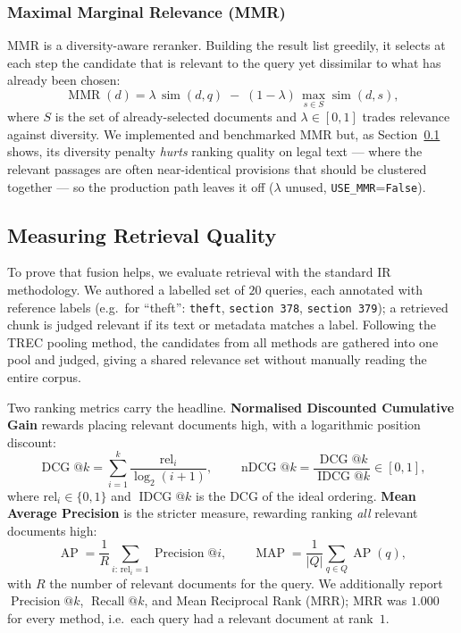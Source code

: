 \subsubsection{Maximal Marginal Relevance (MMR)}
MMR is a diversity-aware reranker. Building the result list greedily, it selects at each step
the candidate that is relevant to the query yet dissimilar to what has already been chosen:
\begin{equation}
\operatorname{MMR}(d) = \lambda\,\operatorname{sim}(d, q)
\;-\; (1-\lambda)\,\max_{s \in S}\operatorname{sim}(d, s),
\end{equation}
where $S$ is the set of already-selected documents and $\lambda \in [0,1]$ trades relevance
against diversity. We implemented and benchmarked MMR but, as Section~\ref{sec:ir-metrics}
shows, its diversity penalty \emph{hurts} ranking quality on legal text --- where the relevant
passages are often near-identical provisions that should be clustered together --- so the
production path leaves it off ($\lambda$ unused, \texttt{USE\_MMR}=\texttt{False}).

\subsection{Measuring Retrieval Quality}
\label{sec:ir-metrics}

To prove that fusion helps, we evaluate retrieval with the standard IR methodology. We
authored a labelled set of $20$ queries, each annotated with reference labels (e.g.\ for
``theft'': \texttt{theft}, \texttt{section~378}, \texttt{section~379}); a retrieved chunk is
judged relevant if its text or metadata matches a label. Following the TREC pooling method,
the candidates from all methods are gathered into one pool and judged, giving a shared
relevance set without manually reading the entire corpus.

Two ranking metrics carry the headline. \textbf{Normalised Discounted Cumulative Gain}
rewards placing relevant documents high, with a logarithmic position discount:
\begin{equation}
\operatorname{DCG}@k = \sum_{i=1}^{k}\frac{\mathrm{rel}_i}{\log_2(i+1)},
\qquad
\operatorname{nDCG}@k = \frac{\operatorname{DCG}@k}{\operatorname{IDCG}@k} \in [0,1],
\end{equation}
where $\mathrm{rel}_i \in \{0,1\}$ and $\operatorname{IDCG}@k$ is the DCG of the ideal ordering.
\textbf{Mean Average Precision} is the stricter measure, rewarding ranking \emph{all} relevant
documents high:
\begin{equation}
\operatorname{AP} = \frac{1}{R}\sum_{i:\,\mathrm{rel}_i = 1}\operatorname{Precision}@i,
\qquad
\operatorname{MAP} = \frac{1}{|Q|}\sum_{q \in Q}\operatorname{AP}(q),
\end{equation}
with $R$ the number of relevant documents for the query. We additionally report
$\operatorname{Precision}@k$, $\operatorname{Recall}@k$, and Mean Reciprocal Rank (MRR);
MRR was $1.000$ for every method, i.e.\ each query had a relevant document at rank~$1$.

